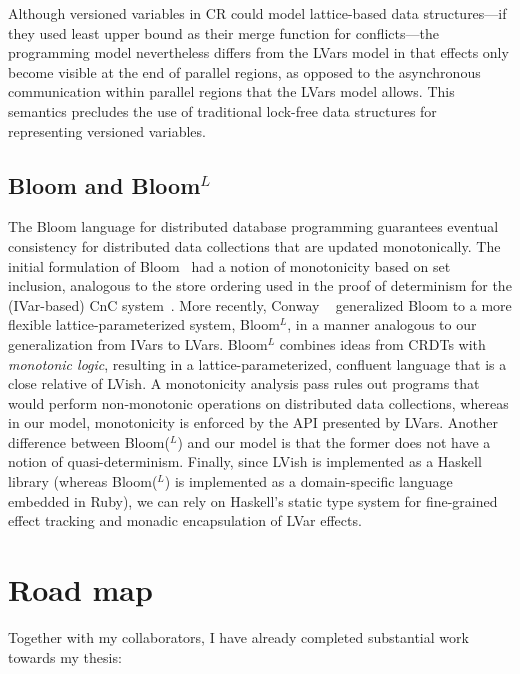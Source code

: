 \documentclass{article}
\begin{document}
Although versioned variables in CR could model lattice-based data
structures---if they used least upper bound as their merge function
for conflicts---the programming model nevertheless differs from the
LVars model in that effects only become visible at the end of parallel
regions, as opposed to the asynchronous communication within parallel
regions that the LVars model allows.  This semantics precludes the use
of traditional lock-free data structures for representing versioned
variables.

\subsection{Bloom and Bloom$^L$}

The Bloom language for distributed database programming guarantees
eventual consistency for distributed data collections that are updated
monotonically.  The initial formulation of Bloom~\cite{bloom-cidr} had
a notion of monotonicity based on set inclusion, analogous to the
store ordering used in the proof of determinism for the (IVar-based)
CnC system~\cite{CnC}.  More recently, Conway \etal~\cite{blooml}
generalized Bloom to a more flexible lattice-parameterized system,
Bloom$^L$, in a manner analogous to our generalization from IVars to
LVars.  Bloom$^L$ combines ideas from CRDTs with \emph{monotonic
  logic}, resulting in a lattice-parameterized, confluent language
that is a close relative of LVish.  A monotonicity analysis pass rules
out programs that would perform non-monotonic operations on
distributed data collections, whereas in our model, monotonicity is
enforced by the API presented by LVars.  Another difference between
Bloom($^L$) and our model is that the former does not have a notion of
quasi-determinism.  Finally, since LVish is implemented as a
Haskell library (whereas Bloom($^L$) is implemented as a
domain-specific language embedded in Ruby), we can rely on Haskell's
static type system for fine-grained effect tracking and monadic
encapsulation of LVar effects.

\section{Road map}

Together with my collaborators, I have already completed substantial
work towards my thesis:
\end{document}
